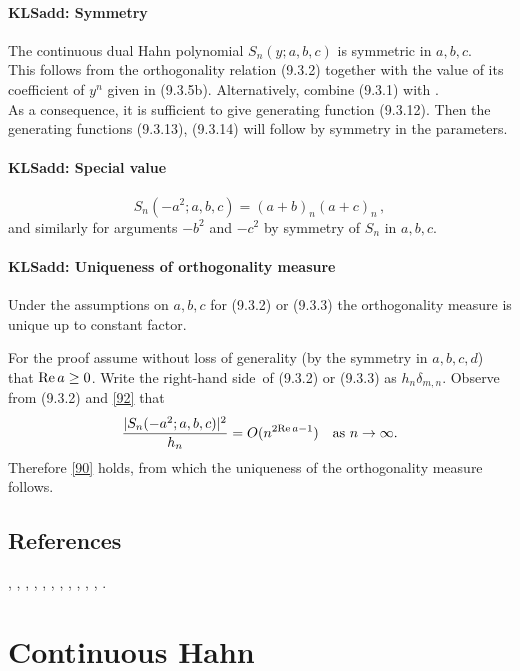 \documentclass[envcountchap,graybox]{svmono}
\newcounter{rom}
\newcommand\de\delta
\newcommand\iy\infty
\newcommand\RHS{right-hand side}
\renewcommand\Re{{\rm Re}\,}
\begin{document}
\paragraph{\large\bf KLSadd: Symmetry}The continuous dual Hahn polynomial $S_n(y;a,b,c)$ is symmetric
in $a,b,c$.\\
This follows from the orthogonality relation (9.3.2)
together with the value of its coefficient of $y^n$ given in (9.3.5b).
Alternatively, combine (9.3.1) with .\\
As a consequence, it is sufficient to give generating function (9.3.12). Then the generating
functions (9.3.13), (9.3.14) will follow by symmetry in the parameters.
%
\paragraph{\large\bf KLSadd: Special value}\begin{equation}
S_n(-a^2;a,b,c)=(a+b)_n(a+c)_n\,,
\label{92}
\end{equation}
and similarly for arguments $-b^2$ and $-c^2$ by symmetry of $S_n$ in $a,b,c$.
%
\paragraph{\large\bf KLSadd: Uniqueness of orthogonality measure}Under the assumptions on $a,b,c$ for (9.3.2) or (9.3.3) the orthogonality
measure is unique up to constant factor.

For the proof assume without
loss of generality (by the symmetry in $a,b,c,d$) that $\Re a\geq0$.
Write the \RHS\ of (9.3.2) or (9.3.3) as $h_n\de_{m,n}$.
Observe from (9.3.2) and \eqref{92} that
\[
\frac{|S_n(-a^2;a,b,c)|^2}{h_n} = O(n^{2\Re a-1})\quad
\hbox{as $n\to\iy$.}
\]
Therefore \eqref{90} holds, from which the uniqueness of the orthogonality
measure follows.
%
\subsection*{References}
\cite{AskeyWilson85}, \cite{IsmailLetVal89}, \cite{Koorn85}, \cite{Koorn88},
\cite{Lesky94II}, \cite{Lesky95I}, \cite{Lesky95II}, \cite{Letessier84},
\cite{Letessier86}, \cite{MimachiII}, \cite{Neuman}, \cite{ValentAssche}.


\section{Continuous Hahn}
\end{document}
